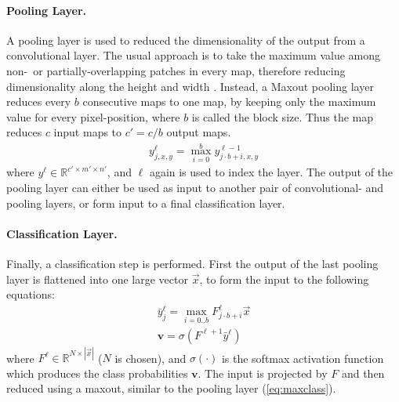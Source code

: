 \paragraph{Pooling Layer.} A pooling layer is used to reduced the
dimensionality of the output from a convolutional layer. The usual
approach is to take the maximum value among non-~or
partially-overlapping patches in every map, therefore reducing
dimensionality along the height and width \cite{weng1992}. Instead, a Maxout
pooling layer reduces every $b$ consecutive maps to one map, by keeping only 
the maximum value for every pixel-position, where $b$ is
called the block size. Thus the map reduces $c$ input maps to $c' = c / b$ output maps.
\begin{align}
\label{eq:pool}
y_{j,x,y}^{\ell} = \max_{i=0}^b y^{\ell-1}_{j\cdot b+i,x,y}
\end{align}
\noindent
where $y^\ell \in \mathbb{R}^{c' \times m' \times n'}$, and $\ell$ again is used to index the
layer.  The output of the pooling layer can either be used as input to
another pair of convolutional- and pooling layers, or form input to a
final classification layer.

\paragraph{Classification Layer.}
Finally, a classification step is performed. First the output of the last pooling
layer is flattened into one large vector $\vec{x}$, to form the input to the following equations:
\begin{align}
\bar{y}_j^\ell = \max_{i=0..b}F_{j\cdot b+i}^\ell \vec{x} \label{eq:maxclass}\\
\mathbf{v} = \sigma(F^{\ell+1} \bar{y}^\ell)\label{eq:softmax1}
\end{align}
where $F^\ell \in
\mathds{R}^{N \times |\vec{x}|}$ ($N$ is chosen), and $\sigma(\cdot)$
is the softmax activation function which produces the class
probabilities $\mathbf{v}$. The input is projected
by $F$ and then reduced using a maxout, similar to the pooling layer
(\ref{eq:maxclass}).  



